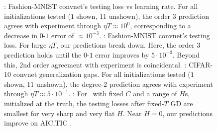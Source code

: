         \begin{figure}[h!]
            \centering  
            \caption{
                \protect{}: 
                Fashion-MNIST convnet's testing loss vs learning rate.
                For all initializations tested ($1$
                shown, $11$ unshown), the order $3$ prediction agrees with
                experiment through $\eta T \approx 10^0$, corresponding to
                a decrease in $0\mbox{-}1$ error of $\approx 10^{-3}$.
                \protect{}:
                Fashion-MNIST convnet's testing loss.
                For large $\eta T$, our predictions
                break down.  Here, the order $3$ prediction holds until the
                $0\mbox{-}1$ error improves by $5\cdot 10^{-3}$.  Beyond
                this, $2$nd order agreement with experiment is
                coincidental.  
                \protect{}: CIFAR-10 convnet generalization gaps.  For all
                initializations tested ($1$ shown, $11$ unshown), the degree-$2$
                prediction agrees with experiment through $\eta T \approx
                5\cdot 10^{-1}$.
                \protect{}: For \MeanEstimation\, with fixed $C$ and
                a range of $H$s, initialized at the truth, the testing
                losses after fixed-$T$ GD are smallest for very sharp and
                very flat $H$.  Near $H=0$, our predictions improve on AIC,TIC
                \citep{di18}.
            }
            \label{fig:experiments}
        \end{figure}
